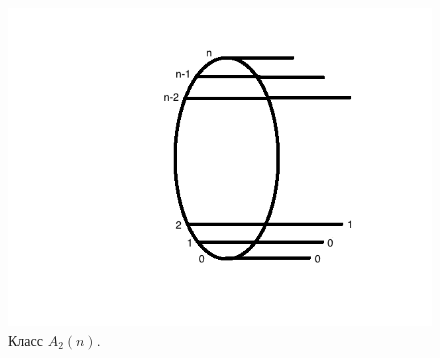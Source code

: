 \documentclass[oneside, final, 14pt]{extreport}
\begin{document}
\begin{figure}[h]
\begin{center}
\begin{minipage}[h]{0.3\linewidth}
 		\includegraphics[width=1\linewidth]{A2}
 		\caption{Класс $A_2(n)$.}
 		\label{ris:A2}
 	\end{minipage}
 	\end{center}
 \end{figure}
	
\end{document}
